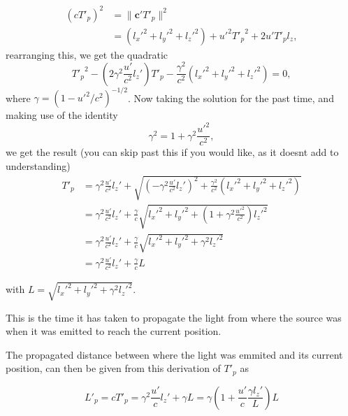 \begin{derivation}
	\begin{equation}
		\begin{split}
			\left( c T'_{p}\right)^2 & = \|\mathbf{c'} T'_{p}\|^2                        \\
			                        & = (l_x'^2 + l_y'^2 + l_z'^2) + u'^2 {T'_{p}}^2 + 2u' T'_{p} l_z,
		\end{split}
	\end{equation}
	rearranging this, we get the quadratic
	\begin{equation}
		{T'_{p}}^{2} - \left(2\gamma^2\frac{u'}{c^2} l_z'\right)T'_{p} - \frac{\gamma^2}{c^2}(l_x'^2 + l_y'^2 + l_z'^2) = 0,
	\end{equation}
	where $\gamma = (1 - u'^2/c^2)^{-1/2}$. Now taking the solution for the past time, and making use of the identity
	\begin{equation}
		\gamma^2 = 1+\gamma^2\frac{u'^2}{c^2},
	\end{equation}
	we get the result (you can skip past this if you would like, as it doesnt add to understanding)
	\begin{equation}
		\begin{split}
			T'_{p} & = \gamma^2\frac{u'}{c^2} l_z' + \sqrt{\left(-\gamma^2\frac{u'}{c^2} l_z' \right)^2+\frac{\gamma^2}{c^2}(l_x'^2 + l_y'^2+ l_z'^2)} \\
			      & = \gamma^2\frac{u'}{c^2} l_z' + \frac{\gamma}{c}\sqrt{l_x'^2+ l_y'^2+\left(1+\gamma^2\frac{u'^2}{c^2}\right) l_z'^2}        \\
			      & = \gamma^2\frac{u'}{c^2} l_z' + \frac{\gamma}{c}\sqrt{l_x'^2 + l_y'^2+\gamma^2 l_z'^2}                                      \\
			      & = \gamma^2\frac{u'}{c^2} l_z' + \frac{\gamma}{c} L
		\end{split}
	\end{equation}

	with $ L=\sqrt{l_x'^2+l_y'^2+\gamma^2 l_z'^2}$.

	This is the time it has taken to propagate the light from where the source was when it was emitted to reach the current position.

\end{derivation}

The propagated distance between where the light was emmited and its current position, can then be given from this derivation of $T'_{p}$ as

\begin{equation}
	\label{eq: propagation distance}
	L'_{p} = cT'_{p} = \gamma^2 \frac{u'}{c} l_z' + \gamma  L = \gamma \left( 1 + \frac{u'}{c} \frac{\gamma l_z'}{L} \right) L
\end{equation}

